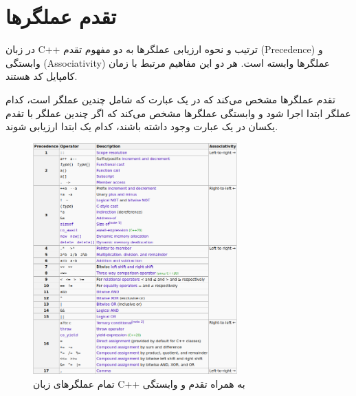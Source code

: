 \documentclass{article}
\begin{document}
\section*{تقدم عملگر‌ها}

در زبان C++ ترتیب و نحوه ارزیابی عملگر‌ها به دو مفهوم تقدم (Precedence) و وابستگی (Associativity) عملگر‌ها وابسته است. هر دو این مفاهیم مرتبط با زمان کامپایل کد هستند.

تقدم عملگرها مشخص می‌کند که در یک عبارت که شامل چندین عملگر است، کدام عملگر ابتدا اجرا شود و وابستگی عملگرها مشخص می‌کند که اگر چندین عملگر با تقدم یکسان در یک عبارت وجود داشته باشند، کدام یک ابتدا ارزیابی شوند.


\begin{figure}[h!]
    \centering
    \includegraphics[width=0.7\textwidth]{1-operations.png}
    \caption{تمام عملگرهای زبان C++ به همراه تقدم و وابستگی}
    \label{fig:example}
\end{figure}
\end{document}
